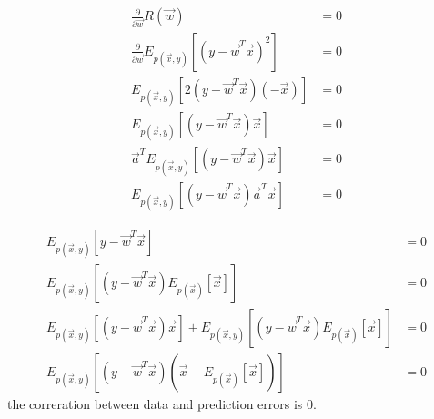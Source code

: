 \documentclass{introtosml}
\newcommand\Ep[1]{E_{p(\vec{x}, y)} \left[ #1 \right]}
\begin{document}
\maketitle

\begin{p}
  \item
    \begin{align*}
      \frac{\partial}{\partial \vec{w}} R(\vec{w}) & = 0 \\
      \frac{\partial}{\partial \vec{w}} \Ep{(y - {\vec{w}}^T \vec{x})^2 } & = 0 \\
      \Ep{2 (y - {\vec{w}}^T \vec{x}) (-\vec{x})} & = 0 \\
      \Ep{(y - {\vec{w}}^T \vec{x}) \vec{x}} & = 0 \label{eq:corr0} \\
      \vec{a}^T \Ep{(y - {\vec{w}}^T \vec{x}) \vec{x}} & = 0 \\
      \Ep{(y - {\vec{w}}^T \vec{x}) \vec{a}^T \vec{x}} & = 0
    \end{align*}

  \item
    \begin{align*}
      \Ep{y - \vec{w}^T \vec{x}} & = 0 \\
      \Ep{(y - \vec{w}^T \vec{x}) E_{p(\vec{x})} \left[ \vec{x} \right]} & = 0 \\
      \Ep{(y - \vec{w}^T \vec{x}) \vec{x}}
          + \Ep{(y - \vec{w}^T \vec{x}) E_{p(\vec{x})} \left[ \vec{x} \right]} & = 0 \\
      \Ep{(y - \vec{w}^T \vec{x}) (\vec{x} - E_{p(\vec{x})} \left[ \vec{x} \right])} & = 0
    \end{align*}
    \therefore the correration between data and prediction errors is 0.


\end{p}
\end{document}
